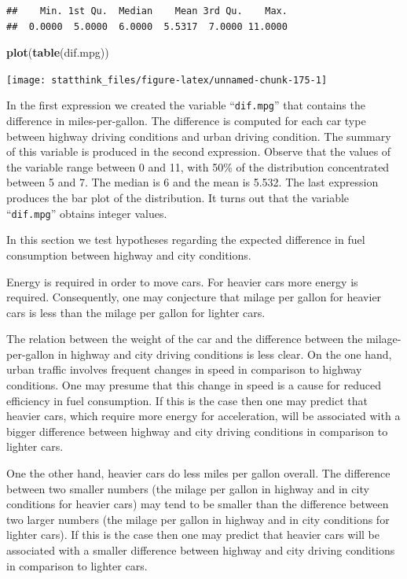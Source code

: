 \documentclass[]{krantz}
\makeatletter
\newenvironment{Shaded}{\begin{snugshade}}{\end{snugshade}}
\newcommand{\KeywordTok}[1]{\textcolor[rgb]{0.13,0.29,0.53}{\textbf{#1}}}
\newcommand{\NormalTok}[1]{#1}
\newenvironment{kframe}{%
\medskip{}
\setlength{\fboxsep}{.8em}
 \def\at@end@of@kframe{}%
 \ifinner\ifhmode%
  \def\at@end@of@kframe{\end{minipage}}%
  \begin{minipage}{\columnwidth}%
 \fi\fi%
 \def\FrameCommand##1{\hskip\@totalleftmargin \hskip-\fboxsep
 \colorbox{shadecolor}{##1}\hskip-\fboxsep
     \hskip-\linewidth \hskip-\@totalleftmargin \hskip\columnwidth}%
 \MakeFramed {\advance\hsize-\width
   \@totalleftmargin\z@ \linewidth\hsize
   \@setminipage}}%
 {\par\unskip\endMakeFramed%
 \at@end@of@kframe}
\renewenvironment{Shaded}{\begin{kframe}}{\end{kframe}}
\theoremstyle{definition}
\theoremstyle{definition}
\theoremstyle{definition}
\theoremstyle{remark}
\makeatother
\begin{document}
\begin{verbatim}
##    Min. 1st Qu.  Median    Mean 3rd Qu.    Max. 
##  0.0000  5.0000  6.0000  5.5317  7.0000 11.0000
\end{verbatim}

\begin{Shaded}
\begin{Highlighting}[]
\KeywordTok{plot}\NormalTok{(}\KeywordTok{table}\NormalTok{(dif.mpg))}
\end{Highlighting}
\end{Shaded}

\begin{center}\texttt{[image: statthink\_files/figure-latex/unnamed-chunk-175-1]} \end{center}

In the first expression we created the variable ``\texttt{dif.mpg}''
that contains the difference in miles-per-gallon. The difference is
computed for each car type between highway driving conditions and urban
driving condition. The summary of this variable is produced in the
second expression. Observe that the values of the variable range between
0 and 11, with 50\% of the distribution concentrated between 5 and 7.
The median is 6 and the mean is 5.532. The last expression produces the
bar plot of the distribution. It turns out that the variable
``\texttt{dif.mpg}'' obtains integer values.

In this section we test hypotheses regarding the expected difference in
fuel consumption between highway and city conditions.

Energy is required in order to move cars. For heavier cars more energy
is required. Consequently, one may conjecture that milage per gallon for
heavier cars is less than the milage per gallon for lighter cars.

The relation between the weight of the car and the difference between
the milage-per-gallon in highway and city driving conditions is less
clear. On the one hand, urban traffic involves frequent changes in speed
in comparison to highway conditions. One may presume that this change in
speed is a cause for reduced efficiency in fuel consumption. If this is
the case then one may predict that heavier cars, which require more
energy for acceleration, will be associated with a bigger difference
between highway and city driving conditions in comparison to lighter
cars.

One the other hand, heavier cars do less miles per gallon overall. The
difference between two smaller numbers (the milage per gallon in highway
and in city conditions for heavier cars) may tend to be smaller than the
difference between two larger numbers (the milage per gallon in highway
and in city conditions for lighter cars). If this is the case then one
may predict that heavier cars will be associated with a smaller
difference between highway and city driving conditions in comparison to
lighter cars.
\end{document}
